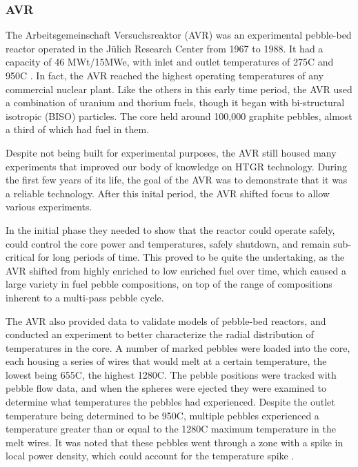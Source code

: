 \subsubsection{AVR}

The Arbeitsgemeinschaft Versuchsreaktor (AVR) was an experimental pebble-bed reactor operated in the Jülich Research Center from 1967 to 1988.  It had a capacity of 46 MWt/15MWe, with inlet and outlet temperatures of 275\textdegree  C and 950\textdegree  C \cite{beck_high_nodate}.  In fact, the AVR reached the highest operating temperatures of any commercial nuclear plant.  Like the others in this early time period, the AVR used a combination of uranium and thorium fuels, though it began with bi-structural isotropic (BISO) particles.  The core held around 100,000 graphite pebbles, almost a third of which had fuel in them.

Despite not being built for experimental purposes, the AVR still housed many experiments that improved our body of knowledge on HTGR technology.  During the first few years of its life, the goal of the AVR was to demonstrate that it was a reliable technology.  After this inital period, the AVR shifted focus to allow various experiments.

In the initial phase they needed to show that the reactor could operate safely, could control the core power and temperatures, safely shutdown, and remain sub-critical for long periods of time.  This proved to be quite the undertaking, as the AVR shifted from highly enriched to low enriched fuel over time, which caused a large variety in fuel pebble compositions, on top of the range of compositions inherent to a multi-pass pebble cycle.

The AVR also provided data to validate models of pebble-bed reactors, and conducted an experiment to better characterize the radial distribution of temperatures in the core.  A number of marked pebbles were loaded into the core, each housing a series of wires that would melt at a certain temperature, the lowest being 655\textdegree  C, the highest 1280\textdegree  C.  The pebble positions were tracked with pebble flow data, and when the spheres were ejected they were examined to determine what temperatures the pebbles had experienced.  Despite the outlet temperature being determined to be 950\textdegree  C, multiple pebbles experienced a temperature greater than or equal to the 1280\textdegree C maximum temperature in the melt wires.  It was noted that these pebbles went through a zone with a spike in local power density, which could account for the temperature spike \cite{noauthor_results_1990}.

